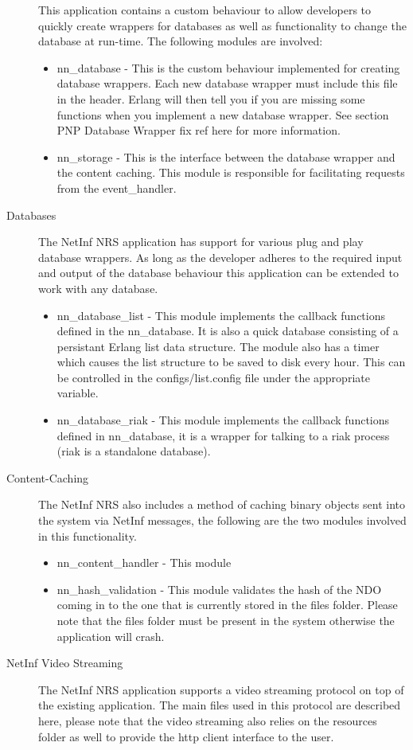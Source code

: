 \begin{description}
This application contains a custom behaviour to allow developers to quickly create wrappers for databases as well as functionality to change the database at run-time. The following modules are involved:
\begin {itemize}
\item nn\_database - This is the custom behaviour implemented for creating database wrappers. Each new database wrapper must include this file in the header. Erlang will then tell you if you are missing some functions when you implement a new database wrapper. See section  PNP Database Wrapper {fix ref here} for more information.
\item nn\_storage - This is the interface between the database wrapper and the content caching. This module is responsible for facilitating requests from the event\_handler.
\end{itemize}
\item[Databases]
The NetInf NRS application has support for various plug and play database wrappers. As long as the developer adheres to the required input and output of the database behaviour this application can be extended to work with any database. 
\begin{itemize}
\item nn\_database\_list - This module implements the callback functions defined in the nn\_database. It is also a quick database consisting of a persistant Erlang list data structure. The module also has a timer which causes the list structure to be saved to disk every hour. This can be controlled in the configs/list.config file under the appropriate variable.
\item nn\_database\_riak - This module implements the callback functions defined in nn\_database, it is a wrapper for talking to a riak process (riak is a standalone database).
\end{itemize}
\item[Content-Caching]
The NetInf NRS also includes a method of caching binary objects sent into the system via NetInf messages, the following are the two modules involved in this functionality.
\begin {itemize}
\item nn\_content\_handler - This module
\item nn\_hash\_validation - This module validates the hash of the NDO coming in to the one that is currently stored in the files folder. Please note that the files folder must be present in the system otherwise the application will crash. 
\end{itemize}
\item[NetInf Video Streaming]
The NetInf NRS application supports a video streaming protocol on top of the existing application. The main files used in this protocol are described here, please note that the video streaming also relies on the resources folder as well to provide the http client interface to the user. 


\end{description}
